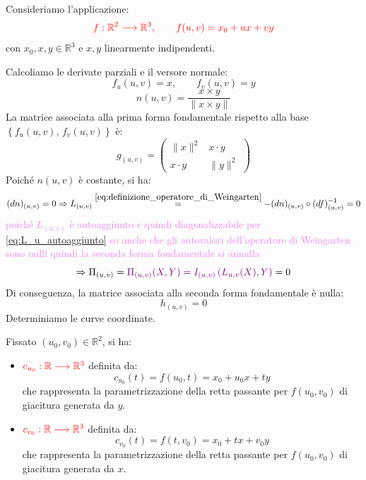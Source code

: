         \newpage
        \begin{esempio}[Piano]
        \mbox{}

        Consideriamo l'applicazione:
        \[
        \textcolor{red}{f : \mathbb{R}^2 \longrightarrow \mathbb{R}^3, \qquad f(u,v) = x_0 + ux + vy}
        \]
        con $x_0, x, y \in \mathbb{R}^3$ e $x, y$ linearmente indipendenti.

        Calcoliamo le derivate parziali e il versore normale:
        \[ f_u(u,v) = x, \qquad f_v(u,v) = y \]
        \[ n(u,v) = \frac{x \times y}{\|x \times y\|} \]
        La matrice associata alla prima forma fondamentale rispetto alla base $\left\{f_u (u,v),\, f_v (u,v)\right\}$ è:
        \[ g_{(u,v)} = 
        \begin{pmatrix}
        \|x\|^2 & x \cdot y \\[6pt]
        x \cdot y & \|y\|^2
        \end{pmatrix}\]
        Poiché $n(u,v)$ è costante, si ha:
        \[  (dn)_{(u,v)} = 0 \Rightarrow L_{(u,v)} \overset{\eqref{eq:definizione_operatore_di_Weingarten}}{=} -(dn)_{(u,v)} \circ (df)_{(u,v)}^{-1} = 0 \]
        \textcolor{violet}{poiché $L_{(u,v)}$ è autoaggiunto e quindi diagonalizzabile per \eqref{eq:L_u_autoaggiunto} 
        so anche che gli autovalori dell'operatore di Weingarten sono nulli quindi la seconda forma fondamentale si annulla}
        \[ \Rightarrow \Pi_{(u,v)} = \textcolor{violet}{\Pi_{(u,v)}(X,Y)= I_{(u,v)} \left( L_{u,v}(X), Y \right)} =0 \]
        Di conseguenza, la matrice associata alla seconda forma fondamentale è nulla:
        \[ h_{(u,v)} = 0 \]
        Determiniamo le curve coordinate. 
        
        Fissato $(u_0, v_0) \in \mathbb{R}^2$, si ha:
        \begin{itemize}
            \item $\textcolor{red}{c_{u_0} : \mathbb{R} \longrightarrow \mathbb{R}^3}$ definita da:
            \[
            c_{u_0}(t) = f(u_0, t) = x_0 + u_0 x + t y
            \]
            che rappresenta la parametrizzazione della retta passante per $f(u_0, v_0)$ di giacitura generata da $y$.
            
            \item $\textcolor{red}{c_{v_0} : \mathbb{R} \longrightarrow \mathbb{R}^3}$ definita da:
            \[
            c_{v_0}(t) = f(t, v_0) = x_0 + t x + v_0 y
            \]
            che rappresenta la parametrizzazione della retta passante per $f(u_0, v_0)$ di giacitura generata da $x$.
        \end{itemize}
        \begin{center}
\end{center}
\end{esempio}
